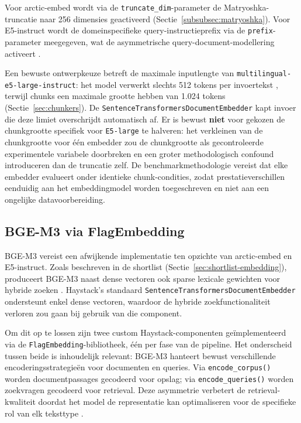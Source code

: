 Voor arctic-embed wordt via de \texttt{truncate\_dim}-parameter de Matryoshka-truncatie naar 256 dimensies geactiveerd (Sectie~\ref{subsubsec:matryoshka}). Voor E5-instruct wordt de domeinspecifieke query-instructieprefix via de \texttt{prefix}-parameter meegegeven, wat de asymmetrische query-document-modellering activeert \autocite{WangEtAl2022}.

Een bewuste ontwerpkeuze betreft de maximale inputlengte van \texttt{multilingual-e5-large-instruct}: het model verwerkt slechts 512 tokens per invoertekst \autocite{WangEtAl2024b}, terwijl chunks een maximale grootte hebben van 1.024 tokens (Sectie~\ref{sec:chunkers}). De \texttt{SentenceTransformersDocumentEmbedder} kapt invoer die deze limiet overschrijdt automatisch af. Er is bewust \textbf{niet} voor gekozen de chunkgrootte specifiek voor \texttt{E5-large} te halveren: het verkleinen van de chunkgrootte voor één embedder zou de chunkgrootte als gecontroleerde experimentele variabele doorbreken en een groter methodologisch confound introduceren dan de truncatie zelf. De benchmarkmethodologie vereist dat elke embedder evalueert onder identieke chunk-condities, zodat prestatieverschillen eenduidig aan het embeddingmodel worden toegeschreven en niet aan een ongelijke datavoorbereiding.

\subsection{BGE-M3 via FlagEmbedding}
\label{subsec:bge-m3-embedder}

BGE-M3 vereist een afwijkende implementatie ten opzichte van arctic-embed en E5-instruct. Zoals beschreven in de shortlist (Sectie~\ref{sec:shortlist-embedding}), produceert BGE-M3 naast dense vectoren ook sparse lexicale gewichten voor hybride zoeken \autocite{Chen2024}. Haystack's standaard \texttt{SentenceTransformersDocumentEmbedder} ondersteunt enkel dense vectoren, waardoor de hybride zoekfunctionaliteit verloren zou gaan bij gebruik van die component.

Om dit op te lossen zijn twee custom Haystack-componenten geïmplementeerd via de \texttt{FlagEmbedding}-bibliotheek, één per fase van de pipeline. Het onderscheid tussen beide is inhoudelijk relevant: BGE-M3 hanteert bewust verschillende encoderingsstrategieën voor documenten en queries. Via \texttt{encode\_corpus()} worden documentpassages gecodeerd voor opslag; via \texttt{encode\_queries()} worden zoekvragen gecodeerd voor retrieval. Deze asymmetrie verbetert de retrieval-kwaliteit doordat het model de representatie kan optimaliseren voor de specifieke rol van elk teksttype \autocite{Chen2024}.


